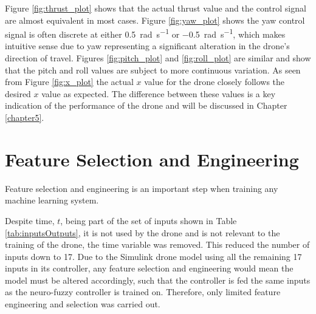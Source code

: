 Figure \ref{fig:thrust_plot}  shows that the actual thrust value and the control signal are almost equivalent in most cases. Figure \ref{fig:yaw_plot} shows the yaw control signal is often discrete at either \SI{0.5}{\radian\per\second} or \SI{-0.5}{\radian\per\second}, which makes intuitive sense due to yaw representing a significant alteration in the drone’s direction of travel. Figures \ref{fig:pitch_plot}  and \ref{fig:roll_plot} are similar and show that the pitch and roll values are subject to more continuous variation. As seen from Figure \ref{fig:x_plot} the actual $x$ value for the drone closely follows the desired $x$ value as expected. The difference between these values is a key indication of the performance of the drone and will be discussed in Chapter \ref{chapter5}. 
\section{Feature Selection and Engineering} \label{feature selection}
Feature selection and engineering is an important step when training any machine learning system. 

Despite time, $t$, being part of the set of inputs shown in Table \ref{tab:inputsOutputs}, it is not used by the drone and is not relevant to the training of the drone, the time variable was removed. This reduced the number of inputs down to 17. Due to the Simulink drone model using all the remaining 17 inputs in its controller, any feature selection and engineering would mean the model must be altered accordingly, such that the controller is fed the same inputs as the neuro-fuzzy controller is trained on. Therefore, only limited feature engineering and selection was carried out.  

